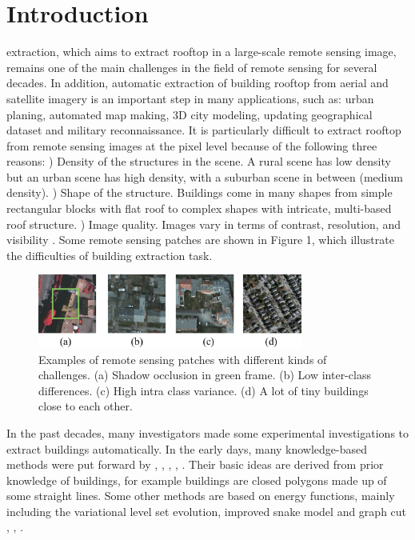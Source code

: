 %
\section{Introduction}
\label{sec:intro}
 extraction, which aims to extract rooftop in a large-scale remote sensing image, remains one of the main challenges in the field of remote sensing for several decades. In addition, automatic extraction of building rooftop from aerial and satellite imagery is an important step in many applications, such as: urban planing, automated map making, 3D city modeling, updating geographical dataset and military reconnaissance. It is particularly difficult to extract rooftop from remote sensing images at the pixel level because of the following three reasons: ) Density of the structures in the scene. A rural scene has low density but an urban scene has high density, with a suburban scene in between (medium density).  ) Shape of the structure. Buildings come in many shapes from simple rectangular blocks with flat roof to complex shapes with intricate, multi-based roof structure.  ) Image quality. Images vary in terms of contrast, resolution, and visibility  \cite{IEEEexample:huertas1988detecting}. Some remote sensing patches are shown in Figure 1, which illustrate the difficulties of building extraction task. \par
\begin{figure}
\includegraphics[width=8.7cm]{Figures/challenge.eps}
\caption{Examples of remote sensing patches with different kinds of challenges. (a) Shadow occlusion in green frame. (b) Low inter-class differences. (c) High intra class variance. (d) A lot of tiny buildings close to each other.}
\label{1}
\end{figure}
\setlength{\parindent}{2ex}In the past decades, many investigators made some experimental investigations to extract buildings automatically. In the early days, many knowledge-based methods were put forward by \cite{IEEEexample:huertas1988detecting}, \cite{IEEEexample:noronha2001detection}, \cite{IEEEexample:nosrati2009novel}, \cite{IEEEexample:izadi2012three}, \cite{IEEEexample:wang2015efficient}. Their basic ideas are derived from prior knowledge of buildings, for example buildings are closed polygons made up of some straight lines. Some other methods are based on energy functions, mainly including the variational level set evolution, improved snake model and graph cut \cite{IEEEexample:cote2013automatic}, \cite{IEEEexample:peng2005improved}, \cite{IEEEexample:sirmacek2009urban}.\par
